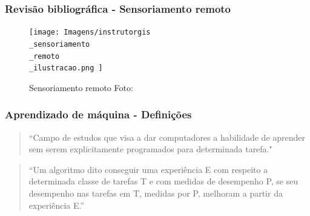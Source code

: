 \documentclass{beamer}
\begin{document}
\begin{frame}
    \frametitle{Revisão bibliográfica - Sensoriamento remoto}
    \begin{figure}[!ht]
        \centering
        \texttt{[image: 
            Imagens/instrutorgis\\\_sensoriamento\\\_remoto\\\_ilustracao.png
        ]}
        \caption{Sensoriamento remoto Foto:\cite{InstrutorGIS}}
    \label{fig:sensoriamento}
    \end{figure}
    \end{frame}

\begin{frame}
\frametitle{Aprendizado de máquina - Definições}

\begin{quotation}
    
“Campo de estudos que visa a dar computadores a habilidade de aprender sem serem explicitamente programados para determinada tarefa." ~\cite{Samuel1959SomeSI}
\end{quotation}

\begin{quotation}
“Um algoritmo dito conseguir uma experiência E com respeito a determinada classe de tarefas T e com medidas de desempenho P, se seu desempenho nas tarefas em T, medidas por P, melhoram a partir da experiência E.” ~\cite{Mitchell97} 
\end{quotation}


\end{frame}
\end{document}
